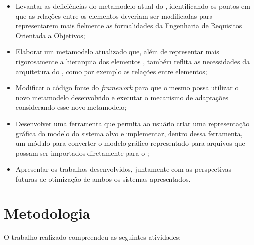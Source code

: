 \begin{itemize}
	
	\item Levantar as deficiências do metamodelo atual do \zanshin, identificando os pontos em que as relações entre os elementos deveriam ser modificadas para representarem mais fielmente as formalidades da Engenharia de Requisitos Orientada a Objetivos;
	
	\item Elaborar um metamodelo atualizado que, além de representar mais rigorosamente a hierarquia dos elementos \gore, também reflita as necessidades da arquitetura do \zanshin, como por exemplo as relações entre elementos;
	
	\item Modificar o código fonte do \textit{framework} para que o mesmo possa utilizar o novo metamodelo desenvolvido e executar o mecanismo de adaptações considerando esse novo metamodelo;
	
	\item Desenvolver uma ferramenta que permita ao usuário criar uma representação gráfica do modelo do sistema alvo e implementar, dentro dessa ferramenta, um módulo para converter o modelo gráfico representado para arquivos \xml que possam ser importados diretamente para o \zanshin;
	
	\item Apresentar os trabalhos desenvolvidos, juntamente com as perspectivas futuras de otimização de ambos os sistemas apresentados.

\end{itemize}


\section{Metodologia}
\label{sec-intro-metodologia}

O trabalho realizado compreendeu as seguintes atividades:


